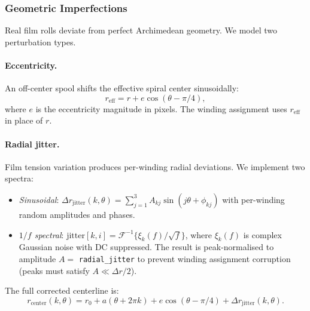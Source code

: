 \documentclass[11pt,a4paper]{article}
\begin{document}
\subsubsection{Geometric Imperfections}

Real film rolls deviate from perfect Archimedean geometry. We model two perturbation types.

\paragraph{Eccentricity.} An off-center spool shifts the effective spiral center sinusoidally:
\begin{equation}
    r_{\text{eff}} = r + e\cos(\theta - \pi/4),
\end{equation}
where $e$ is the eccentricity magnitude in pixels. The winding assignment uses $r_{\text{eff}}$ in place of $r$.

\paragraph{Radial jitter.} Film tension variation produces per-winding radial deviations. We implement two spectra:
\begin{itemize}
    \item \textit{Sinusoidal}: $\Delta r_{\text{jitter}}(k,\theta) = \sum_{j=1}^{3} A_{kj}\sin(j\theta + \phi_{kj})$ with per-winding random amplitudes and phases.
    \item \textit{$1/f$ spectral}: $\text{jitter}[k,i] = \mathcal{F}^{-1}\!\bigl\{\xi_k(f)/\sqrt{f}\bigr\}$, where $\xi_k(f)$ is complex Gaussian noise with DC suppressed. The result is peak-normalised to amplitude $A = $ \texttt{radial\_jitter} to prevent winding assignment corruption (peaks must satisfy $A \ll \Delta r / 2$).
\end{itemize}

The full corrected centerline is:
\begin{equation}
    r_{\text{center}}(k,\theta) = r_0 + a(\theta + 2\pi k) + e\cos(\theta - \pi/4) + \Delta r_{\text{jitter}}(k,\theta).
\end{equation}
\end{document}
